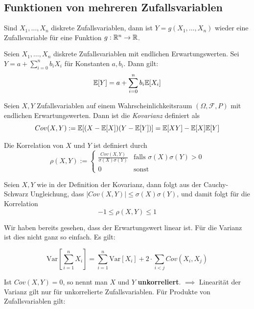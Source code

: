 \subsection{Funktionen von mehreren Zufallsvariablen}
Sind $X_1,\dots,X_n$ diskrete Zufallsvariablen, dann ist $Y = g(X_1,\dots,X_n)$ wieder eine Zufallsvariable für eine Funktion $g:\mathbb{R}^n \to \mathbb{R}$.

\begin{satz}
Seien $X_1,\dots,X_n$ diskrete Zufallsvariablen mit endlichen Erwartungswerten. Sei $Y = a + \sum_{i=0}^n  b_i X_i$ für Konstanten $a,b_i$. Dann gilt:
$$ \mathbb{E}[Y] = a + \sum_{i = 0}^n b_i \mathbb{E}[X_i]$$
\end{satz}

\begin{definition}
Seien $X,Y$ Zufallsvariablen auf einem Wahrscheinlichkeitsraum $(\Omega, \mathcal{F}, P)$ mit endlichen Erwartungswerten. Dann ist die \textit{Kovarianz} definiert als
$$ Cov(X,Y) := \mathbb{E}[(X-\mathbb{E}[X])(Y-\mathbb{E}[Y])] = \mathbb{E}[XY] - \mathbb{E}[X]\mathbb{E}[Y]$$
\end{definition}

\begin{definition}
Die Korrelation von $X$ und $Y$ ist definiert durch
$$ \rho(X,Y) := \begin{cases} \frac{Cov(X,Y)}{\sigma(X)\sigma(Y)} & \mbox{falls } \sigma(X)\sigma(Y) > 0 \\ 0 & \mbox{sonst} \end{cases}$$
\end{definition}

\begin{satz}
Seien $X,Y$ wie in der Definition der Kovarianz, dann folgt aus der Cauchy-Schwarz Ungleichung, dass $|Cov(X,Y)| \leq \sigma(X)\sigma(Y)$, und damit folgt für die Korrelation
$$ -1 \leq \rho(X,Y) \leq 1$$
\end{satz}

Wir haben bereits gesehen, dass der Erwartungswert linear ist. Für die Varianz ist dies nicht ganz so einfach. Es gilt:

\begin{korollar}
$$ \mbox{Var}\left[\sum_{i=1}^n X_i \right] = \sum_{i=1}^n \mbox{Var}[X_i] + 2 \cdot \sum_{i < j} Cov(X_i, X_j)$$
\end{korollar}
Ist $Cov(X,Y) = 0$, so nennt man $X$ und $Y$ \textbf{unkorreliert}. $\implies$ Linearität der Varianz gilt nur für unkorrelierte Zufallsvariablen. Für Produkte von Zufallsvariablen gilt:

